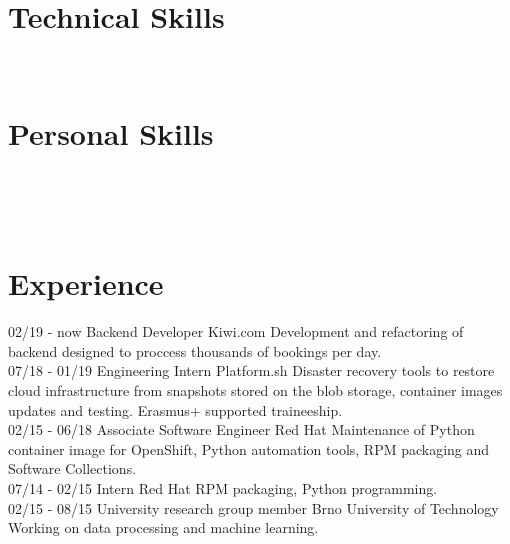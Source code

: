 \documentclass[]{friggeri-cv}
\begin{document}
\begin{aside}
  \section{Technical Skills}
    ~
  \section{Personal Skills}
    ~
\end{aside}
~
\section{Experience}
\begin{entrylist}
  \entry
    {02/19 - now}
    {Backend Developer}
    {Kiwi.com}
    {Development and refactoring of backend designed to proccess thousands of bookings per day.\\}
  \entry
    {07/18 - 01/19}
    {Engineering Intern}
    {Platform.sh}
    {Disaster recovery tools to restore cloud infrastructure from snapshots stored on the blob storage,
    container images updates and testing. Erasmus+ supported traineeship.\\}
  \entry
    {02/15 - 06/18}
    {Associate Software Engineer}
    {Red Hat}
    {Maintenance of Python container image for OpenShift, Python automation tools, RPM packaging and
    Software Collections.\\}
  \entry
    {07/14 - 02/15}
    {Intern}
    {Red Hat}
    {RPM packaging, Python programming.\\}
  \entry
    {02/15 - 08/15}
    {University research group member}
    {Brno University of Technology}
    {Working on data processing and machine learning.\\}
\end{entrylist}
~
\end{document}
